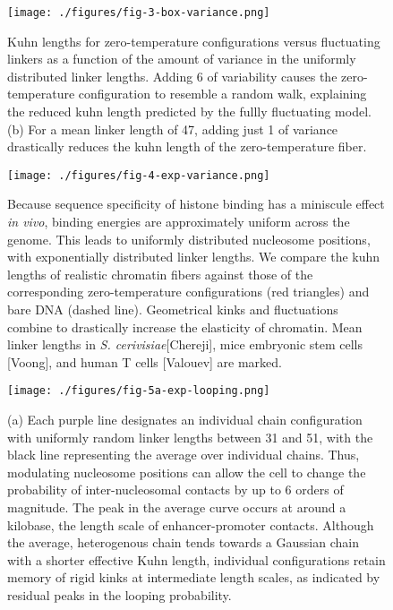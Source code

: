 \documentclass[%
 reprint,
superscriptaddress,
showpacs,preprintnumbers,
 amsmath,amssymb,
 aps,
 prl,
]{revtex4-1}
\begin{document}
\begin{figure}[t]
    \centering
    \texttt{[image: ./figures/fig-3-box-variance.png]}
    \caption{Kuhn lengths for zero-temperature configurations versus
    fluctuating linkers as a function of the amount of variance in the uniformly
    distributed linker lengths.  Adding \SI{6}{\basepair} of variability causes the zero-temperature
    configuration to resemble a random walk, explaining the reduced kuhn
    length predicted by the fullly fluctuating model. (b) For a mean linker
    length of \SI{47}{\basepair}, adding just \SI{1}{\basepair} of variance
    drastically reduces the kuhn length of the zero-temperature fiber.}
\end{figure}
\begin{figure}[t]
    \centering
    \texttt{[image: ./figures/fig-4-exp-variance.png]}
    \caption{Because sequence specificity of histone binding has a miniscule effect
    \textit{in vivo}, binding energies are approximately uniform across the
    genome. This leads to uniformly distributed nucleosome positions, with exponentially distributed linker lengths. We compare
    the kuhn lengths of realistic chromatin fibers against those of the
    corresponding zero-temperature configurations (red
    triangles) and bare
    DNA (dashed line). Geometrical kinks and fluctuations combine to drastically
    increase the elasticity of chromatin. Mean linker lengths in \textit{S.
    cerivisiae}[Chereji], mice embryonic stem cells [Voong], and human T cells
    [Valouev] are marked.}
\end{figure}
\begin{figure}[t]
    \centering
    \texttt{[image: ./figures/fig-5a-exp-looping.png]}
    \caption{(a) Each purple line designates an individual chain configuration
    with uniformly random linker lengths between 31 and \SI{51}{\basepair}, with
    the black line representing the average over individual chains. Thus, modulating nucleosome positions can allow the cell to change
    the probability of inter-nucleosomal contacts by up to 6 orders of
    magnitude. The peak in the average curve occurs at around a kilobase, the
    length scale of enhancer-promoter contacts. Although the average,
    heterogenous chain tends towards a Gaussian chain with a shorter
    effective Kuhn length, individual configurations retain memory of rigid kinks
    at intermediate length scales, as indicated by residual peaks in the looping
    probability.}
\end{figure}
\end{document}
